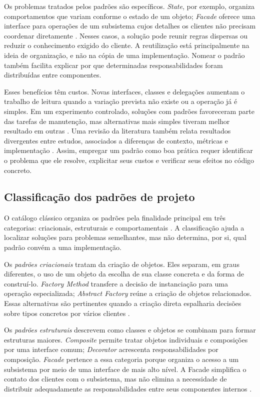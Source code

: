 \documentclass[12pt]{article}
\begin{document}
Os problemas tratados pelos padrões são específicos. \emph{State}, por exemplo, organiza comportamentos que variam conforme o estado de um objeto; \emph{Facade} oferece uma interface para operações de um subsistema cujos detalhes os clientes não precisam coordenar diretamente \cite{gamma1994}. Nesses casos, a solução pode reunir regras dispersas ou reduzir o conhecimento exigido do cliente. A reutilização está principalmente na ideia de organização, e não na cópia de uma implementação. Nomear o padrão também facilita explicar por que determinadas responsabilidades foram distribuídas entre componentes.

Esses benefícios têm custos. Novas interfaces, classes e delegações aumentam o trabalho de leitura quando a variação prevista não existe ou a operação já é simples. Em um experimento controlado, soluções com padrões favoreceram parte das tarefas de manutenção, mas alternativas mais simples tiveram melhor resultado em outras \cite{prechelt2001}. Uma revisão da literatura também relata resultados divergentes entre estudos, associados a diferenças de contexto, métricas e implementação \cite{wedyan2020}. Assim, empregar um padrão como boa prática requer identificar o problema que ele resolve, explicitar seus custos e verificar seus efeitos no código concreto.

\subsection{Classificação dos padrões de projeto}

O catálogo clássico organiza os padrões pela finalidade principal em três categorias: criacionais, estruturais e comportamentais \cite{gamma1994}. A classificação ajuda a localizar soluções para problemas semelhantes, mas não determina, por si, qual padrão convém a uma implementação.

Os \emph{padrões criacionais} tratam da criação de objetos. Eles separam, em graus diferentes, o uso de um objeto da escolha de sua classe concreta e da forma de construí-lo. \emph{Factory Method} transfere a decisão de instanciação para uma operação especializada; \emph{Abstract Factory} reúne a criação de objetos relacionados. Essas alternativas são pertinentes quando a criação direta espalharia decisões sobre tipos concretos por vários clientes \cite{gamma1994}.

Os \emph{padrões estruturais} descrevem como classes e objetos se combinam para formar estruturas maiores. \emph{Composite} permite tratar objetos individuais e composições por uma interface comum; \emph{Decorator} acrescenta responsabilidades por composição. \emph{Facade} pertence a essa categoria porque organiza o acesso a um subsistema por meio de uma interface de mais alto nível. A Facade simplifica o contato dos clientes com o subsistema, mas não elimina a necessidade de distribuir adequadamente as responsabilidades entre seus componentes internos \cite{gamma1994}.
\end{document}
